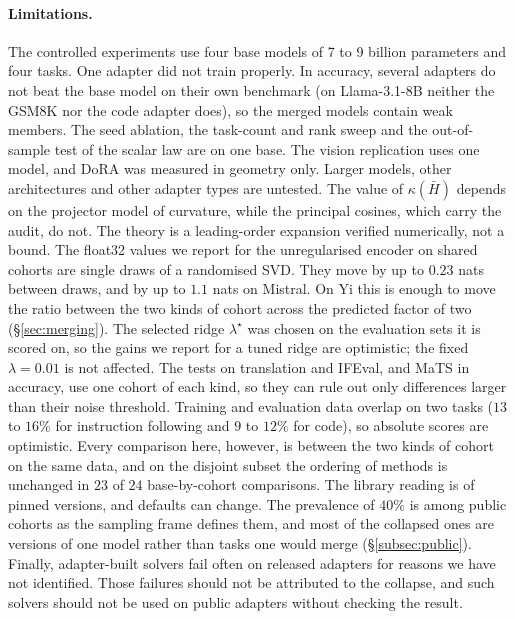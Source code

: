 \paragraph{Limitations.} The controlled experiments use four base models of 7
to 9 billion parameters and four tasks. One adapter did not train properly.
In accuracy, several adapters do not beat the base model on their own
benchmark (on Llama-3.1-8B neither the GSM8K nor the code adapter does), so the
merged models contain weak members. The seed ablation, the task-count and rank
sweep and the out-of-sample test of the scalar law are on one base. The vision
replication uses one model, and DoRA was measured in geometry only. Larger
models, other architectures and other adapter types are untested. The value of
$\kappa(\bar H)$ depends on the projector model of curvature, while the
principal cosines, which carry the audit, do not. The theory is a
leading-order expansion verified numerically, not a bound. The float32 values
we report for the unregularised encoder on shared cohorts are single draws of
a randomised SVD. They move by up to $0.23$ nats between draws, and by up to
$1.1$ nats on Mistral. On Yi this is enough to move the ratio between the two
kinds of cohort across the predicted factor of two (\S\ref{sec:merging}). The
selected ridge $\lambda^\star$ was chosen on the evaluation sets it is scored
on, so the gains we report for a tuned ridge are optimistic; the fixed
$\lambda = 0.01$ is not affected. The tests on translation and IFEval, and
MaTS in accuracy, use one cohort of each kind, so they can rule out only
differences larger than their noise threshold. Training and evaluation data overlap on two tasks ($13$ to $16\%$
for instruction following and $9$ to $12\%$ for code), so absolute scores are
optimistic. Every comparison here, however, is between the two kinds of cohort
on the same data, and on the disjoint subset the ordering of methods is
unchanged in $23$ of $24$ base-by-cohort comparisons. The library reading is of
pinned versions, and defaults can change. The prevalence of $40\%$ is among
public cohorts as the sampling frame defines them, and most of the collapsed
ones are versions of one model rather than tasks one would merge
(\S\ref{subsec:public}). Finally, adapter-built solvers fail often on released
adapters for reasons we have not identified. Those failures should not be
attributed to the collapse, and such solvers should not be used on public
adapters without checking the result.
